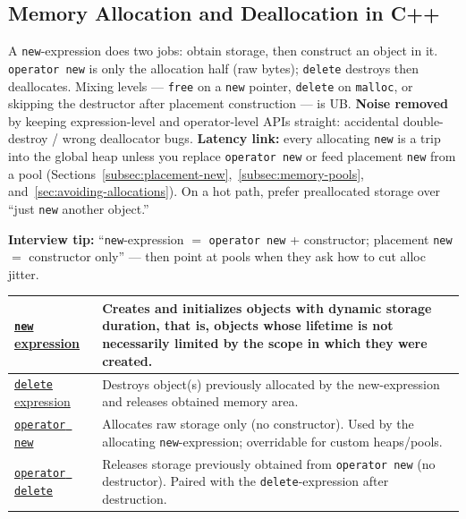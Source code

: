 \subsection{Memory Allocation and Deallocation in C++}
A \texttt{new}-expression does two jobs: obtain storage, then construct an 
object in it. \texttt{operator new} is only the allocation half (raw bytes); 
\texttt{delete} destroys then deallocates. Mixing levels --- 
\texttt{free} on a \texttt{new} pointer, \texttt{delete} on \texttt{malloc}, 
or skipping the destructor after placement construction --- is UB.
\newline
\textbf{Noise removed} by keeping expression-level and operator-level APIs 
straight: accidental double-destroy / wrong deallocator bugs. 
\textbf{Latency link:} every allocating \texttt{new} is a trip into the global 
heap unless you replace \texttt{operator new} or feed placement \texttt{new} 
from a pool (Sections~\ref{subsec:placement-new},~\ref{subsec:memory-pools}, 
and~\ref{sec:avoiding-allocations}). On a hot path, prefer preallocated storage 
over ``just \texttt{new} another object.''
\par\noindent\textbf{Interview tip:} ``\texttt{new}-expression $=$ 
\texttt{operator new} + constructor; placement \texttt{new} $=$ constructor 
only'' --- then point at pools when they ask how to cut alloc jitter.
    \begin{table}[h!t]
        \begin{center}
            \begin{tabularx}{\textwidth}{|l|X|}
                \hline
                \href{https://en.cppreference.com/w/cpp/language/new}{\texttt{new} expression} & Creates and initializes objects with dynamic storage duration, that is, objects whose lifetime is not necessarily limited by the scope in which they were created.\\
                \hline
                \href{https://en.cppreference.com/w/cpp/language/delete}{\texttt{delete} expression} & Destroys object(s) previously allocated by the new-expression and releases obtained memory area. \\
                \hline
                \href{https://en.cppreference.com/w/cpp/memory/new/operator_new}{\texttt{operator new}} & Allocates raw storage only (no constructor). Used by the allocating \texttt{new}-expression; overridable for custom heaps/pools. \\
                \hline
                \href{https://en.cppreference.com/w/cpp/memory/new/operator_delete}{\texttt{operator delete}} & Releases storage previously obtained from \texttt{operator new} (no destructor). Paired with the \texttt{delete}-expression after destruction. \\
                \hline
            \end{tabularx}
        \end{center}
    \end{table}

